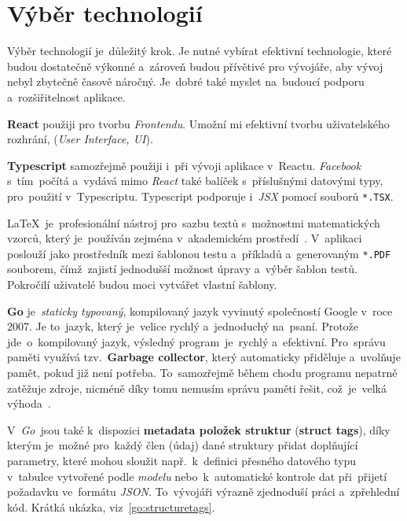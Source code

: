 \documentclass[11pt,a4paper]{report}
\begin{document}
        \section{Výběr technologií}
            Výběr technologií je~důležitý krok. Je nutné vybírat efektivní technologie, které budou dostatečně výkonné a~zároveň budou přívětivé pro vývojáře, aby vývoj nebyl zbytečně časově náročný. Je~dobré také myslet na~budoucí podporu a~rozšiřitelnost aplikace.

            \textbf{React} použiji pro tvorbu \emph{Frontendu}. Umožní mi efektivní tvorbu uživatelského rozhrání, (\emph{User Interface, UI}).

            \textbf{Typescript} samozřejmě použiji i~při vývoji aplikace v~Reactu. \emph{Facebook} s~tím~počítá a~vydává mimo \emph{React} také balíček s~příslušnými datovými typy, pro~použití v~Typescriptu. Typescript podporuje i~\emph{JSX} pomocí souborů \texttt{*.TSX}. \cite[Refeerence/Handbook/JSX]{TypeScript}

            \LaTeX~je~profesionální nástroj pro~sazbu textů s~možnostmi matematických vzorců, který je~používán zejména v~akademickém prostředí~\cite{Rybicka2003:latex}. V~aplikaci poslouží jako prostředník mezi šablonou testu a~příkladů a~generovaným \texttt{*.PDF} souborem, čímž~zajistí jednodušší možnost úpravy a~výběr šablon testů. Pokročilí uživatelé budou moci vytvářet vlastní šablony.

            \textbf{Go} je~\emph{staticky typovaný}, kompilovaný jazyk vyvinutý společností Google v~roce 2007. Je to~jazyk, který je~velice rychlý a~jednoduchý na~psaní. Protože jde~o~kompilovaný jazyk, výsledný program~je~rychlý a~efektivní. Pro~správu paměti využívá tzv.~\textbf{Garbage collector}, který automaticky přiděluje a~uvolňuje pamět, pokud již není potřeba. To~samozřejmě během chodu programu nepatrně zatěžuje zdroje, nicméně díky tomu nemusím správu paměti řešit, což~je~velká výhoda~\cite[7.5]{compilers}.

            V~\emph{Go}~jsou také k~dispozici \textbf{metadata položek struktur} (\textbf{struct tags}), díky kterým je~možné pro~každý člen (údaj) dané struktury přidat doplňující parametry, které mohou sloužit např.~k~definici přesného datového typu v~tabulce vytvořené podle \emph{modelu} nebo~k~automatické kontrole dat při~přijetí požadavku ve~formátu \emph{JSON}. To~vývojáři výrazně zjednoduší práci a~zpřehlední kód. Krátká ukázka, viz~\ref{go:structuretags}.
\end{document}

